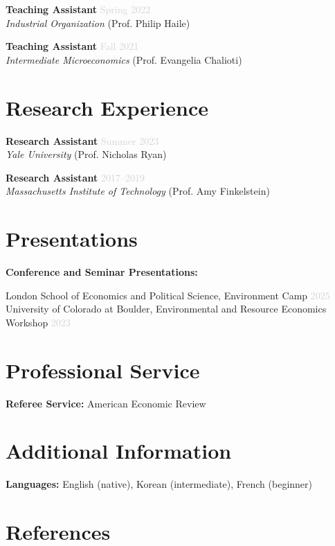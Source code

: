 \documentclass[11pt,letterpaper]{article}
\newcommand{\jobtitle}[1]{\textbf{\color{mediumgray}#1}}
\newcommand{\institution}[1]{\textit{#1}}
\newcommand{\daterange}[1]{\textcolor{lightgray}{#1}}
\begin{document}
\jobtitle{Teaching Assistant} \hfill \daterange{Spring 2022} \\
\institution{Industrial Organization} (Prof. Philip Haile)

\jobtitle{Teaching Assistant} \hfill \daterange{Fall 2021} \\
\institution{Intermediate Microeconomics} (Prof. Evangelia Chalioti)

\section*{Research Experience}

\jobtitle{Research Assistant} \hfill \daterange{Summer 2023} \\
\institution{Yale University} (Prof. Nicholas Ryan)

\jobtitle{Research Assistant} \hfill \daterange{2017--2019} \\
\institution{Massachusetts Institute of Technology} (Prof. Amy Finkelstein)

\section*{Presentations}

\textbf{Conference and Seminar Presentations:}

London School of Economics and Political Science, Environment Camp \hfill \daterange{2025} \\
University of Colorado at Boulder, Environmental and Resource Economics Workshop \hfill \daterange{2023}

\section*{Professional Service}

\textbf{Referee Service:} American Economic Review

\section*{Additional Information}

\textbf{Languages:} English (native), Korean (intermediate), French (beginner)


\section*{References}
\end{document}
